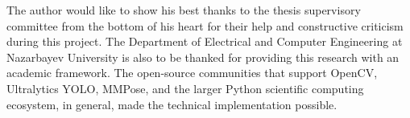 
The author would like to show his best thanks to the thesis supervisory committee from the bottom of his heart for their help and constructive criticism during this project. The Department of Electrical and Computer Engineering at Nazarbayev University is also to be thanked for providing this research with an academic framework. The open-source communities that support OpenCV, Ultralytics YOLO, MMPose, and the larger Python scientific computing ecosystem, in general, made the technical implementation possible.

